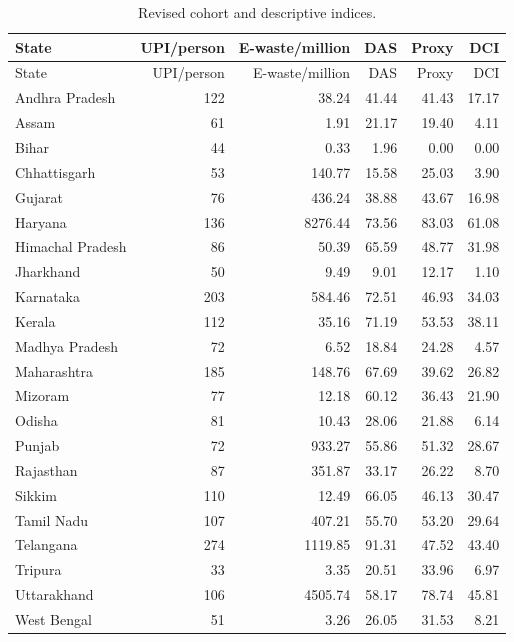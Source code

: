 \begin{longtable}{lrrrrr}
\caption{Revised cohort and descriptive indices.}\\
\toprule State & UPI/person & E-waste/million & DAS & Proxy & DCI \\ \midrule\endfirsthead
\toprule State & UPI/person & E-waste/million & DAS & Proxy & DCI \\ \midrule\endhead
Andhra Pradesh & 122 & 38.24 & 41.44 & 41.43 & 17.17 \\
Assam & 61 & 1.91 & 21.17 & 19.40 & 4.11 \\
Bihar & 44 & 0.33 & 1.96 & 0.00 & 0.00 \\
Chhattisgarh & 53 & 140.77 & 15.58 & 25.03 & 3.90 \\
Gujarat & 76 & 436.24 & 38.88 & 43.67 & 16.98 \\
Haryana & 136 & 8276.44 & 73.56 & 83.03 & 61.08 \\
Himachal Pradesh & 86 & 50.39 & 65.59 & 48.77 & 31.98 \\
Jharkhand & 50 & 9.49 & 9.01 & 12.17 & 1.10 \\
Karnataka & 203 & 584.46 & 72.51 & 46.93 & 34.03 \\
Kerala & 112 & 35.16 & 71.19 & 53.53 & 38.11 \\
Madhya Pradesh & 72 & 6.52 & 18.84 & 24.28 & 4.57 \\
Maharashtra & 185 & 148.76 & 67.69 & 39.62 & 26.82 \\
Mizoram & 77 & 12.18 & 60.12 & 36.43 & 21.90 \\
Odisha & 81 & 10.43 & 28.06 & 21.88 & 6.14 \\
Punjab & 72 & 933.27 & 55.86 & 51.32 & 28.67 \\
Rajasthan & 87 & 351.87 & 33.17 & 26.22 & 8.70 \\
Sikkim & 110 & 12.49 & 66.05 & 46.13 & 30.47 \\
Tamil Nadu & 107 & 407.21 & 55.70 & 53.20 & 29.64 \\
Telangana & 274 & 1119.85 & 91.31 & 47.52 & 43.40 \\
Tripura & 33 & 3.35 & 20.51 & 33.96 & 6.97 \\
Uttarakhand & 106 & 4505.74 & 58.17 & 78.74 & 45.81 \\
West Bengal & 51 & 3.26 & 26.05 & 31.53 & 8.21 \\
\bottomrule\end{longtable}
